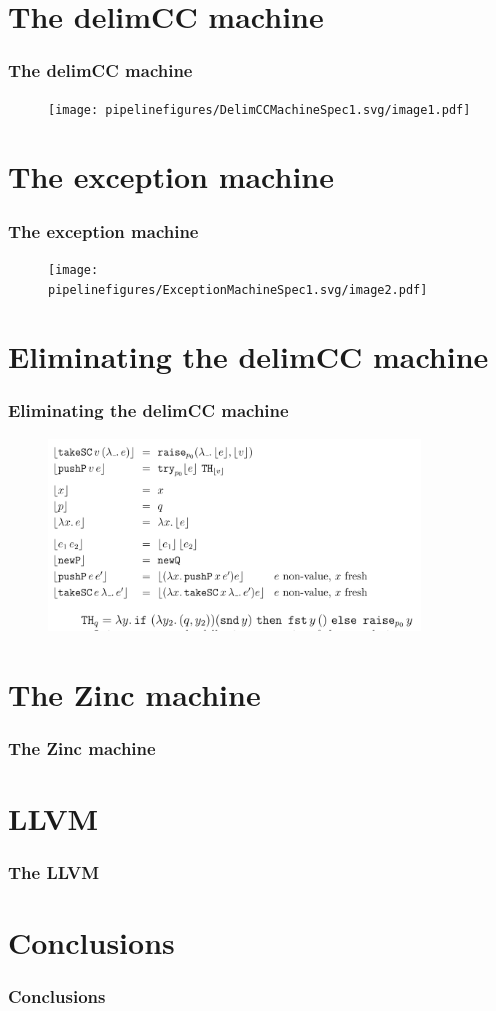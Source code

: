 \documentclass{beamer}
\begin{document}
  \section{The delimCC machine}
  \begin{frame}
    \frametitle{The delimCC machine}
    \begin{figure}[ht]
      \begin{center}        
        \texttt{[image: pipelinefigures/DelimCCMachineSpec1.svg/image1.pdf]}
      \end{center}      
    \end{figure}

  \end{frame}
  \section{The exception machine}
  \begin{frame}
    \frametitle{The exception machine}
    \begin{figure}[ht]
      \begin{center}        
        \texttt{[image: pipelinefigures/ExceptionMachineSpec1.svg/image2.pdf]}
      \end{center}      
    \end{figure}
  \end{frame}
  \section{Eliminating the delimCC machine}
  \begin{frame}
    \frametitle{Eliminating the delimCC machine}
    \begin{figure}[ht]
      \begin{center}        
        \includegraphics[height=2in]{pipelinefigures/EliminatingDelimCCMachine.pdf}
      \end{center}      
    \end{figure}

  \end{frame}
  \section{The Zinc machine}
  \begin{frame}
    \frametitle{The Zinc machine}
  \end{frame}
  \section{LLVM}
  \begin{frame}
    \frametitle{The LLVM}
  \end{frame}
  \section{Conclusions}
  \begin{frame}
    \frametitle{Conclusions}
  \end{frame}
\end{document}
